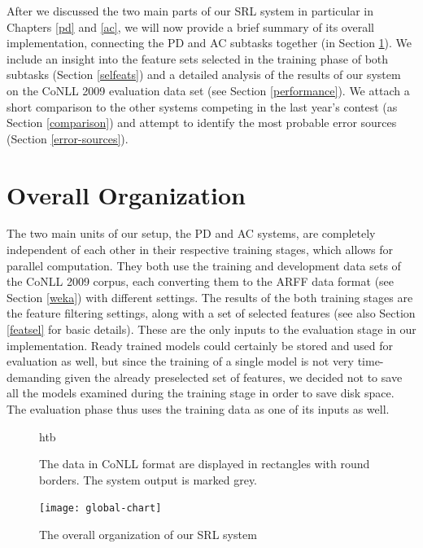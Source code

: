 \documentclass[12pt,notitlepage]{report}
\begin{document}
After we discussed the two main parts of our SRL system in particular in Chapters \ref{pd} and \ref{ac}, we will now provide a brief summary of its overall implementation, connecting the PD and AC subtasks together (in Section \ref{overall}). We include an insight into the feature sets selected in the training phase of both subtasks (Section \ref{selfeats}) and a detailed analysis of the results of our system on the CoNLL 2009 evaluation data set (see Section \ref{performance}). We attach a short comparison to the other systems competing in the last year's contest (as Section \ref{comparison}) and attempt to identify the most probable error sources (Section \ref{error-sources}).

\section{Overall Organization}\label{overall}

The two main units of our setup, the PD and AC systems, are completely independent of each other in their respective training stages, which allows for parallel computation. They both use the training and development data sets of the CoNLL 2009 corpus, each converting them to the ARFF data format (see Section \ref{weka}) with different settings. The results of the both training stages are the feature filtering settings, along with a set of selected features (see also Section \ref{featsel} for basic details). These are the only inputs to the evaluation stage in our implementation. Ready trained models could certainly be stored and used for evaluation as well, but since the training of a single model is not very time-demanding given the already preselected set of features, we decided not to save all the models examined during the training stage in order to save disk space. The evaluation phase thus uses the training data as one of its inputs as well.

\begin{figure}{htb}\footnotesize
\caption{The overall organization of our SRL system}\label{fig:overall}
\noindent The data in CoNLL format are displayed in rectangles with round borders. The system output is marked grey.
\begin{center}
\texttt{[image: global-chart]}
\end{center}
\end{figure}
\end{document}
